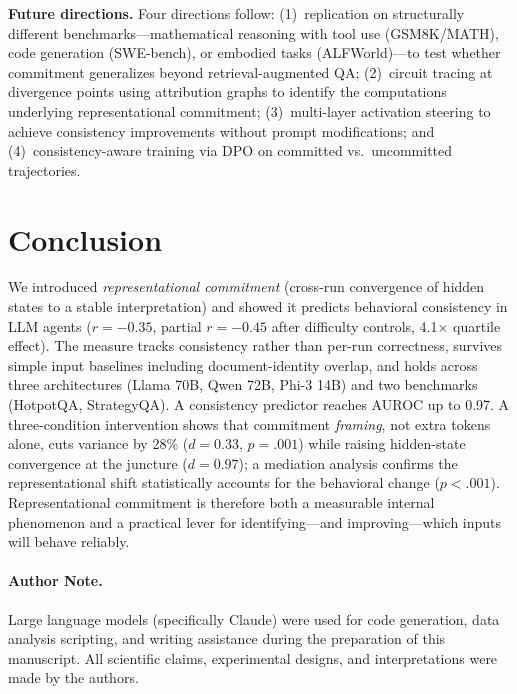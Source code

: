 \documentclass{article}
\begin{document}
\textbf{Future directions.} Four directions follow: (1)~replication on structurally different benchmarks---mathematical reasoning with tool use (GSM8K/MATH), code generation (SWE-bench), or embodied tasks (ALFWorld)---to test whether commitment generalizes beyond retrieval-augmented QA; (2)~circuit tracing at divergence points using attribution graphs \citep{anthropic_circuits} to identify the computations underlying representational commitment; (3)~multi-layer activation steering to achieve consistency improvements without prompt modifications; and (4)~consistency-aware training via DPO on committed vs.\ uncommitted trajectories.

\section{Conclusion}

We introduced \emph{representational commitment} (cross-run convergence of hidden states to a stable interpretation) and showed it predicts behavioral consistency in LLM agents ($r = -0.35$, partial $r = -0.45$ after difficulty controls, 4.1$\times$ quartile effect). The measure tracks consistency rather than per-run correctness, survives simple input baselines including document-identity overlap, and holds across three architectures (Llama 70B, Qwen 72B, Phi-3 14B) and two benchmarks (HotpotQA, StrategyQA). A consistency predictor reaches AUROC up to 0.97. A three-condition intervention shows that commitment \emph{framing}, not extra tokens alone, cuts variance by 28\% ($d = 0.33$, $p = .001$) while raising hidden-state convergence at the juncture ($d = 0.97$); a mediation analysis confirms the representational shift statistically accounts for the behavioral change ($p < .001$). Representational commitment is therefore both a measurable internal phenomenon and a practical lever for identifying---and improving---which inputs will behave reliably.


\paragraph{Author Note.} Large language models (specifically Claude) were used for code generation, data analysis scripting, and writing assistance during the preparation of this manuscript. All scientific claims, experimental designs, and interpretations were made by the authors.
\end{document}
